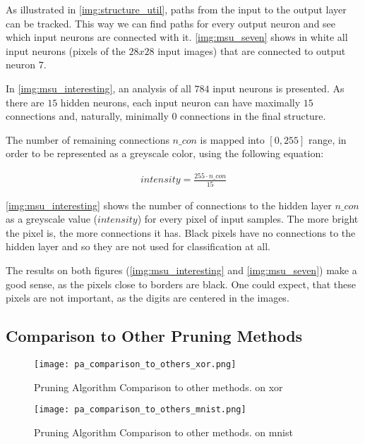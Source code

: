 As illustrated in \cref{img:structure_util}, paths from the input to the output layer can be tracked. This way we can find paths for every output neuron and see which input neurons are connected with it. \cref{img:msu_seven} shows in white all input neurons (pixels of the $ 28x28 $ input images) that are connected to output neuron $ 7 $.

In \cref{img:msu_interesting}, an analysis of all $ 784 $ input neurons is presented. As there are $ 15 $ hidden neurons, each input neuron can have maximally $ 15 $ connections and, naturally, minimally $ 0 $ connections in the final structure. 

The number of remaining connections $ n\_con $ is mapped into $ [0, 255] $ range, in order to be represented as a greyscale color, using the following equation:

\begin{align} \label{eq:grayscale_mapping}
intensity = \frac{255 \cdot n\_con}{15}
\end{align}

\cref{img:msu_interesting} shows the number of connections to the hidden layer $ n\_con $ as a greyscale value ($ intensity $) for every pixel of input samples. The more bright the pixel is, the more connections it has. Black pixels have no connections to the hidden layer and so they are not used for classification at all.

The results on both figures (\ref{img:msu_interesting} and \ref{img:msu_seven}) make a good sense, as the pixels close to borders are black. One could expect, that these pixels are not important, as the digits are centered in the images.

\subsection{Comparison to Other Pruning Methods} \label{comparison_to_other_pa}
\begin{figure}[H]
  \centering
  \texttt{[image: pa\_comparison\_to\_others\_xor.png]}
  \caption{Pruning Algorithm Comparison to other methods. on xor}
  \label{fig:pa_comparison_to_other_xor}
\end{figure}

\begin{figure}[H]
  \centering
  \texttt{[image: pa\_comparison\_to\_others\_mnist.png]}
  \caption{Pruning Algorithm Comparison to other methods. on mnist}
  \label{fig:pa_comparison_to_other_mnist}
\end{figure}

